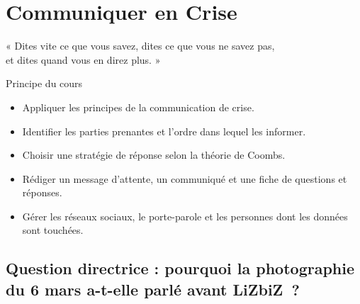 
\chapter{Communiquer en Crise}
\label{chap:communiquer}

\epigraph{%
    « Dites vite ce que vous savez, dites ce que vous ne savez pas,\\
    et dites quand vous en direz plus. »%
}{Principe du cours}


\begin{boxobjectifs}
\begin{itemize}
    \item Appliquer les principes de la communication de crise.
    \item Identifier les parties prenantes et l'ordre dans lequel les
          informer.
    \item Choisir une stratégie de réponse selon la théorie de Coombs.
    \item Rédiger un message d'attente, un communiqué et une fiche de
          questions et réponses.
    \item Gérer les réseaux sociaux, le porte-parole et les personnes dont
          les données sont touchées.
\end{itemize}
\end{boxobjectifs}

\bigskip

\section*{Question directrice : pourquoi la photographie du 6 mars a-t-elle parlé avant LiZbiZ~?}

